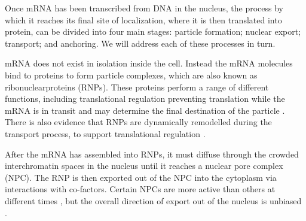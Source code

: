 \documentclass[twocolumn]{biophys}
\begin{document}
Once mRNA has been transcribed from DNA in the nucleus, the process by which it reaches its final site of localization, where it is then translated into protein, can be divided into four main stages: particle formation; nuclear export; transport; and anchoring.
We will address each of these processes in turn.

mRNA does not exist in isolation inside the cell.
Instead the mRNA molecules bind to proteins to form particle complexes, which are also known as ribonuclearproteins (RNPs). 
These proteins perform a range of different functions, including translational regulation preventing translation while the mRNA is in transit and may determine the final destination of the particle \citep{hamilton2013multidisciplinary}.
There is also evidence that RNPs are dynamically remodelled during the transport process, to support translational regulation \citep{weil2012drosophila}.

After the mRNA has assembled into RNPs, it must diffuse through the crowded interchromatin spaces in the nucleus until it reaches a nuclear pore complex (NPC).
The RNP is then exported out of the NPC into the cytoplasm via interactions with co-factors.
Certain NPCs are more active than others at different times \citep{weil2012drosophila}, but the overall direction of export out of the nucleus is unbiased \citep{wilkie2001drosophila}. 
\end{document}
